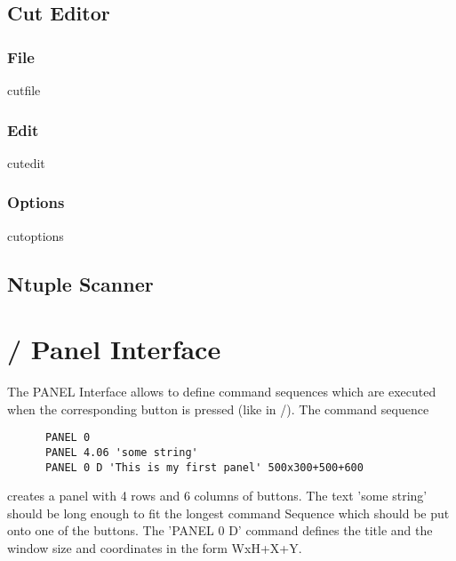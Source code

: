 \newpage

\subsection{Cut Editor}


\subsubsection{File}

\begin{PAWf}{cutfile}
\end{PAWf}

\subsubsection{Edit}

\begin{PAWf}{cutedit}
\end{PAWf}

\subsubsection{Options}

\begin{PAWf}{cutoptions}
\end{PAWf}

\subsection{Ntuple Scanner}



\section{\KUIP/\MOTIF{} Panel Interface}

   The PANEL Interface allows to define command sequences which are executed
   when the corresponding button is pressed (like  in \XPAW/).
   The command sequence

\begin{verbatim}
      PANEL 0
      PANEL 4.06 'some string'
      PANEL 0 D 'This is my first panel' 500x300+500+600
\end{verbatim}

   creates a panel with 4 rows and 6 columns of buttons.  The text 'some
   string' should be long enough to fit the longest command Sequence which
   should be put onto one of the buttons.  The 'PANEL 0 D' command defines the
   title and the window size and coordinates in the form WxH+X+Y.


